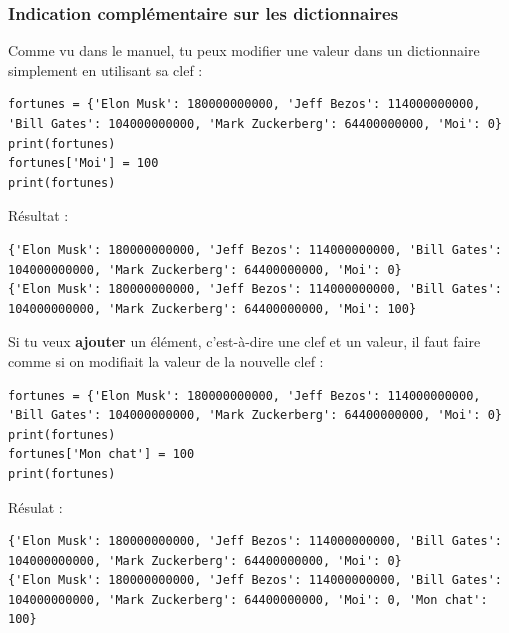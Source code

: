 \documentclass[11pt]{article}
\begin{document}
\subsubsection*{Indication complémentaire sur les dictionnaires}
\label{sec:org783caf7}
Comme vu dans le manuel, tu peux modifier une valeur dans un dictionnaire simplement en utilisant sa clef :
\begin{verbatim}
fortunes = {'Elon Musk': 180000000000, 'Jeff Bezos': 114000000000, 'Bill Gates': 104000000000, 'Mark Zuckerberg': 64400000000, 'Moi': 0}
print(fortunes)
fortunes['Moi'] = 100
print(fortunes)
\end{verbatim}
Résultat :
\begin{verbatim}
{'Elon Musk': 180000000000, 'Jeff Bezos': 114000000000, 'Bill Gates': 104000000000, 'Mark Zuckerberg': 64400000000, 'Moi': 0}
{'Elon Musk': 180000000000, 'Jeff Bezos': 114000000000, 'Bill Gates': 104000000000, 'Mark Zuckerberg': 64400000000, 'Moi': 100}
\end{verbatim}

Si tu veux \textbf{ajouter} un élément, c'est-à-dire une clef et un valeur, il faut faire comme si on modifiait la valeur de la nouvelle clef :
\begin{verbatim}
fortunes = {'Elon Musk': 180000000000, 'Jeff Bezos': 114000000000, 'Bill Gates': 104000000000, 'Mark Zuckerberg': 64400000000, 'Moi': 0}
print(fortunes)
fortunes['Mon chat'] = 100
print(fortunes)
\end{verbatim}
Résulat :
\begin{verbatim}
{'Elon Musk': 180000000000, 'Jeff Bezos': 114000000000, 'Bill Gates': 104000000000, 'Mark Zuckerberg': 64400000000, 'Moi': 0}
{'Elon Musk': 180000000000, 'Jeff Bezos': 114000000000, 'Bill Gates': 104000000000, 'Mark Zuckerberg': 64400000000, 'Moi': 0, 'Mon chat': 100}
\end{verbatim}
\end{document}
